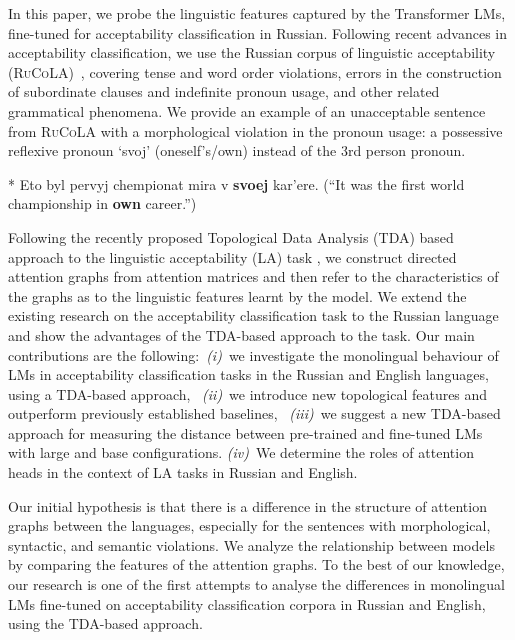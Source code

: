 \documentclass[11pt]{article}
\begin{document}
In this paper, we probe the linguistic features captured by the Transformer LMs, fine-tuned for acceptability classification in Russian. 
Following recent advances in acceptability classification, we use the Russian corpus of linguistic acceptability (\textsc{RuCoLA})~\cite{mikhailov-etal-2022-rucola}, covering tense and word order violations, errors in the construction of subordinate clauses and indefinite pronoun usage, and other related grammatical phenomena.  
We provide an example of an unacceptable sentence from \textsc{RuCoLA} with a morphological violation in the pronoun usage: a possessive reflexive pronoun `svoj' (oneself's/own) instead of the 3rd person pronoun.
\begin{exe}
\ex \label{ex:intro_ex} * Eto byl pervyj chempionat mira v \textbf{svoej} kar'ere.
(``It was the first world championship in \textbf{own} career.'')
\end{exe}
Following the recently proposed Topological Data Analysis (TDA) based approach to the linguistic acceptability (LA) task \cite{cherniavskii-etal-2022-acceptability}, we construct directed attention graphs from attention matrices and then refer to the characteristics of the graphs as to the linguistic features learnt by the model. 
We extend the existing research on the acceptability classification task to the Russian language and show the advantages of the TDA-based approach to the task. 
Our main contributions are the following:~\emph{(i)}~we investigate the monolingual behaviour of LMs in acceptability classification tasks in the Russian and English languages, using a TDA-based approach, 
~\emph{(ii)}~we introduce new topological features and outperform previously established baselines,
~\emph{(iii)}~we suggest a new TDA-based approach for measuring the distance between pre-trained and fine-tuned LMs with large and base configurations. \emph{(iv)}~We determine the roles of attention heads in the context of LA tasks in Russian and English. 

Our initial hypothesis is that there is a difference in the structure of attention graphs between the languages, especially for the sentences with morphological, syntactic, and semantic violations. 
We analyze the relationship between models by comparing the features of the attention graphs.
To the best of our knowledge, our research is one of the first attempts to analyse the differences in monolingual LMs fine-tuned on acceptability classification corpora in Russian and English, using the TDA-based approach.
\end{document}
